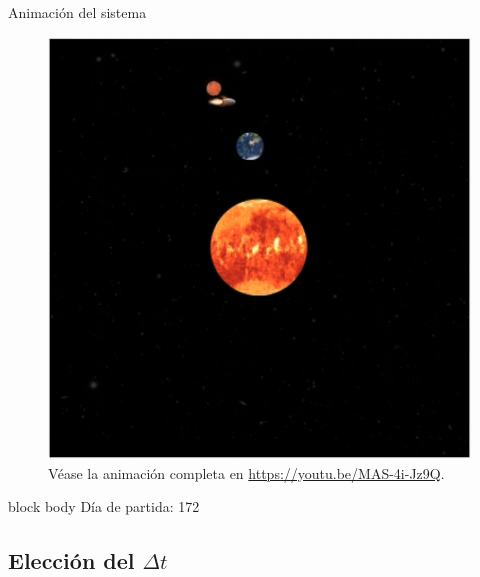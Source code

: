 \documentclass{beamer}
\begin{document}
\begin{frame}{Animación del sistema}{}
\begin{minipage}[t]{0.49\textwidth}
\begin{figure}[H!]
                        \includegraphics[width=\textwidth]{./animacion_marte_2}
                        \caption*{Véase la animación completa en \url{https://youtu.be/MAS-4i-Jz9Q}.}
                        \label{fig:marte_2}
                    \end{figure}
                    \vspace*{-0.5cm}
                    \begin{beamercolorbox}[sep=5pt,center]{block body}
                        \centering
                        \small{Día de partida: 172}
                    \end{beamercolorbox}
                \end{minipage}
            \end{frame}

        \subsection{Elección del $\Delta t$}
\end{document}
